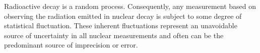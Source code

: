 \documentclass[12pt,a4paper]{article}
\begin{document}
\cite{2010rdm..book.....K} Radioactive decay is a random process. Consequently, any measurement based on observing the radiation emitted in nuclear decay is subject to some degree of statistical fluctuation. These inherent fluctuations represent an unavoidable source of uncertainty in all nuclear measure­ments and often can be the predominant source of imprecision or error.


















\end{document}
